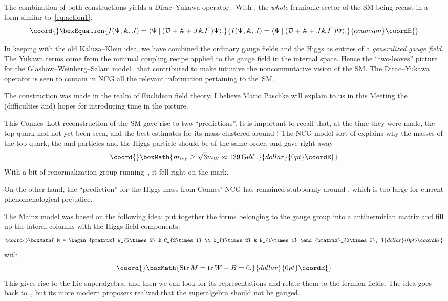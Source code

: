 \documentclass[a4paper,12pt]{article}
\renewcommand{\AA}{\mathbb{A}}      %
\providecommand{\D}{\mathcal{D}}        %
\providecommand{\delslash}{\partial\mkern-9mu/} %
\DeclareMathOperator{\GeV}{GeV}     %
\DeclareMathOperator{\Str}{Str}     %
\providecommand{\stroke}{\mathbin\vert} %
\providecommand{\sul}{\mathfrak{su}}    %
\def\top{\mathrm{top}}              %
\DeclareMathOperator{\tr}{tr}       %
\providecommand{\ul}{\mathfrak{u}}      %
\providecommand{\x}{\times}             %
\providecommand{\1}{\mathbf{1}}         %
\providecommand{\7}{\dagger}            %
\providecommand{\8}{\bullet}            %
\renewcommand{\.}{\cdot}            %
\renewcommand{\:}{\colon}           %
\def\<#1,#2>{\langle#1\stroke#2\rangle} %
\begin{document}
The combination of both constructions yields a Dirac--Yukawa operator
\myHighlight{$\D = i\delslash \oplus \D_F$}\coordHE{}. With \myHighlight{$\AA := \AA'\,\oplus\,\AA''$}\coordHE{}, the
\textit{whole} fermionic sector of the SM being recast in a form
similar to~\eqref{eq:action1}:
\begin{equation}\coord{}\boxEquation{
I(\Psi,\AA,J) = \<\Psi, (\D + \AA + J\AA J^\7) \Psi>.
\label{eq:action2}
}{
I(\Psi,\AA,J) = \<\Psi, (\D + \AA + J\AA J^\7) \Psi>.
}{ecuacion}\coordE{}\end{equation}

In keeping with the old Kaluza--Klein idea, we have combined the
ordinary gauge fields and the Higgs as entries of a
\textit{generalized gauge field}. The Yukawa terms come from the
minimal coupling recipe applied to the gauge field in the internal
space. Hence the ``two-leaves'' picture for the
Glashow--Weinberg--Salam model~\cite{Sirius, KastlerS} that contributed to make
intuitive the noncommutative vision of the SM. The Dirac--Yukawa
operator is seen to contain in NCG all the relevant information
pertaining to the~SM.

The construction was made in the realm of Euclidean field theory. I
believe Mario Paschke will explain to us in this Meeting the
(difficulties and) hopes for introducing time in the picture.

This Connes--Lott reconstruction of the SM gave rise to two
``predictions''. It is important to recall that, at the time they were
made, the top quark had not yet been seen, and the best estimates for
its mass clustered around \myHighlight{$130 \GeV$}\coordHE{}! The NCG model sort of explains
why the masses of the top quark, the \coordHE{} and \coordHE{} particles and the
Higgs particle should be of the same order, and gave right away
$$\coord{}\boxMath{
m_\top \geq \sqrt{3} m_W \approx 139 \GeV.
}{dollar}{0pt}\coordE{}$$
With a bit of renormalization group running~\cite{Orpheus}, it fell
right on the mark.

On the other hand, the ``prediction'' for the Higgs mass from Connes'
NCG has remained stubbornly around \myHighlight{$200 \GeV$}\coordHE{}, which is too large for
current phenomenological prejudice.

\smallskip

The Mainz \myHighlight{$\sul(2|1)$}\coordHE{} model was based on the following idea: put
together the \coordHE{} forms belonging to the \myHighlight{$\sul(2) \x \ul(1)$}\coordHE{} gauge
group into a \myHighlight{$3 \x 3$}\coordHE{} antihermitian matrix and fill up the lateral
columns with the Higgs field components:
$$\coord{}\boxMath{
M = \begin{pmatrix}
W_{2\x2} & C_{2\x1} \\ D_{1\x2} & B_{1\x1}
\end{pmatrix}_{3\x3},
}{dollar}{0pt}\coordE{}$$
with
$$\coord{}\boxMath{
\Str M = \tr W - B = 0.
}{dollar}{0pt}\coordE{}$$
This gives rise to the Lie superalgebra, and then we can look for its
representations and relate them to the fermion fields. The idea goes
back to~\cite{Neeman}, but its more modern proposers realized that the
superalgebra should not be gauged.
\end{document}
